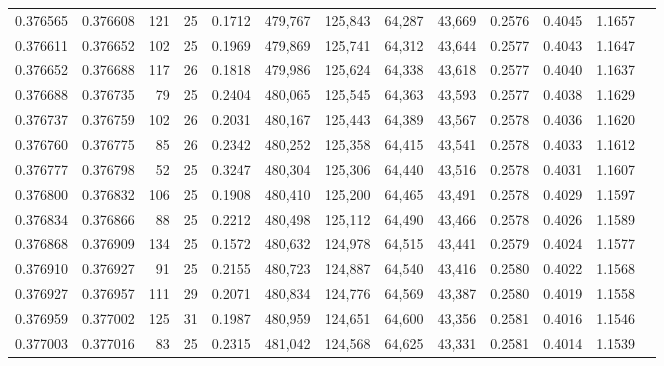 \begin{tabular}{rrrrrrrrrrrrr}
0.376565 & 0.376608 &   121 &  25 &                                     0.1712 & 479,767 & 125,843 &  64,287 &  43,669 & 0.2576 & 0.4045 & 1.1657 \\
0.376611 & 0.376652 &   102 &  25 &                                     0.1969 & 479,869 & 125,741 &  64,312 &  43,644 & 0.2577 & 0.4043 & 1.1647 \\
0.376652 & 0.376688 &   117 &  26 &                                     0.1818 & 479,986 & 125,624 &  64,338 &  43,618 & 0.2577 & 0.4040 & 1.1637 \\
0.376688 & 0.376735 &    79 &  25 &                                     0.2404 & 480,065 & 125,545 &  64,363 &  43,593 & 0.2577 & 0.4038 & 1.1629 \\
0.376737 & 0.376759 &   102 &  26 &                                     0.2031 & 480,167 & 125,443 &  64,389 &  43,567 & 0.2578 & 0.4036 & 1.1620 \\
0.376760 & 0.376775 &    85 &  26 &                                     0.2342 & 480,252 & 125,358 &  64,415 &  43,541 & 0.2578 & 0.4033 & 1.1612 \\
0.376777 & 0.376798 &    52 &  25 &                                     0.3247 & 480,304 & 125,306 &  64,440 &  43,516 & 0.2578 & 0.4031 & 1.1607 \\
0.376800 & 0.376832 &   106 &  25 &                                     0.1908 & 480,410 & 125,200 &  64,465 &  43,491 & 0.2578 & 0.4029 & 1.1597 \\
0.376834 & 0.376866 &    88 &  25 &                                     0.2212 & 480,498 & 125,112 &  64,490 &  43,466 & 0.2578 & 0.4026 & 1.1589 \\
0.376868 & 0.376909 &   134 &  25 &                                     0.1572 & 480,632 & 124,978 &  64,515 &  43,441 & 0.2579 & 0.4024 & 1.1577 \\
0.376910 & 0.376927 &    91 &  25 &                                     0.2155 & 480,723 & 124,887 &  64,540 &  43,416 & 0.2580 & 0.4022 & 1.1568 \\
0.376927 & 0.376957 &   111 &  29 &                                     0.2071 & 480,834 & 124,776 &  64,569 &  43,387 & 0.2580 & 0.4019 & 1.1558 \\
0.376959 & 0.377002 &   125 &  31 &                                     0.1987 & 480,959 & 124,651 &  64,600 &  43,356 & 0.2581 & 0.4016 & 1.1546 \\
0.377003 & 0.377016 &    83 &  25 &                                     0.2315 & 481,042 & 124,568 &  64,625 &  43,331 & 0.2581 & 0.4014 & 1.1539 \\

\end{tabular}
